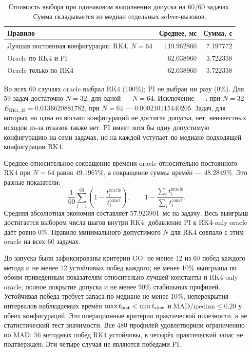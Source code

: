 \begin{table}[!htbp]
\centering
\caption{Стоимость выбора при одинаковом выполнении допуска на 60/60
задачах. Сумма складывается из медиан отдельных solver-вызовов.}
\label{tab:costpilot-selection}
\small
\begin{tabular}{p{}rr}
\toprule
Правило & Среднее, мс & Сумма, с\\
\midrule
Лучшая постоянная конфигурация: RK4, $N=64$
 & 119.962860 & 7.197772\\
Oracle по RK4 и PI
 & 62.038960 & 3.722338\\
Oracle только по RK4
 & 62.038960 & 3.722338\\
\bottomrule
\end{tabular}
\end{table}

Во всех 60 случаях oracle выбрал RK4 (100\%); PI не выбран ни разу
(0\%). Для 59 задач достаточно $N=32$, для одной --- $N=64$.
Исключение --- : при $N=32$
$E_{\mathrm{RK4},33}=0.0136620881782$, при $N=64$ ---
$0.000210115440205$. Задач, для которых ни одна из восьми конфигураций
не достигла допуска, нет; неизвестных исходов из-за отказов также нет.
PI имеет хотя бы одну допустимую конфигурацию на семи задачах,
но на каждой уступает по медиане подходящей конфигурации RK4.

Среднее относительное сокращение времени oracle относительно постоянного
RK4 при $N=64$ равно $49.1967\%$, а сокращение суммы времён ---
$48.2849\%$. Это разные показатели:
\[
\frac1{60}\sum_{i=1}^{60}
\left(1-\frac{t_i^{\mathrm{oracle}}}{t_i^{\mathrm{const}}}\right),
\qquad
1-\frac{\sum_i t_i^{\mathrm{oracle}}}{\sum_i t_i^{\mathrm{const}}}.
\]
Средняя абсолютная экономия составляет 57.923901~мс на задачу.
Весь выигрыш достигается выбором числа шагов внутри RK4:
добавление PI к RK4-only oracle даёт ровно $0\%$.
Правило минимального допустимого $N$ для RK4 совпало с этим oracle
на всех 60 задачах.

До запуска были зафиксированы критерии GO: не менее 12 из 60 побед
каждого метода и не менее 12 устойчивых побед каждого; не менее 10\%
выигрыша по обоим приведённым показателям относительно лучшей константы
и RK4-only oracle; полное покрытие допуска и не менее 90\% стабильных
профилей. Устойчивая победа требует запаса по медиане не менее 10\%,
неперекрытия интервалов наблюдаемых времён
$\max t_{\rm fast}<\min t_{\rm slow}$ и
$\mathrm{MAD}/\mathrm{median}\le0.20$ у обеих конфигураций.
Это операционные критерии практической полезности, а не статистический
тест значимости. Все 480 профилей удовлетворили ограничению по MAD;
56 методных побед RK4 устойчивы, в четырёх практический запас не
подтверждён. Эти четыре случая не являются победами PI.

